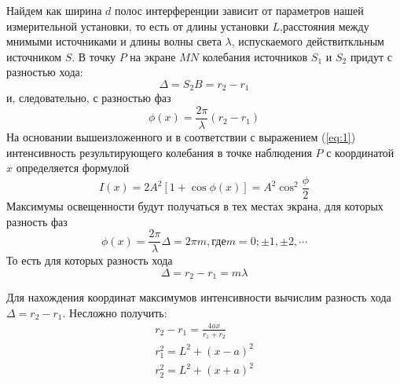Найдем как ширина $d$ полос интерференции зависит от параметров нашей измерительной установки, то есть от длины установки $L$,расстояния между мнимыми источниками и длины волны света  
$\lambda$, испускаемого действиткльным источником $S$. В точку $P$ на экране $MN$ колебания источников $S_1$ и $S_2$ придут с разностью хода:
\begin{equation}
	\Delta=S_2B=r_2-r_1
\end{equation}
и, следовательно, с разностью фаз
\begin{equation}
	\phi(x)=\frac{2\pi}{\lambda}(r_2-r_1)
\end{equation}
На основании вышеизложенного и в соответствии с выражением (\ref{eq:1}) интенсивность результирующего колебания в точке наблюдения $P$ с координатой $x$ определяется формулой
\begin{equation}
	I(x)=2A^2[1+\cos{\phi(x)}]=A^2\cos^2{\frac{\phi}{2}}
\end{equation}
Максимумы освещенности будут получаться в тех местах экрана, для которых разность фаз
\begin{equation}
	\phi(x)=\frac{2\pi}{\lambda}\Delta=2\pi m, \text{где} m=0;\pm 1,\pm 2,\cdots
\end{equation}
То есть для которых разность хода
\begin{equation}
	\Delta=r_2-r_1=m\lambda
\end{equation}

Для нахождения координат максимумов интенсивности вычислим разность хода $\Delta=r_2-r_1$. Несложно получить: 
\begin{gather}
	\label{eq:8}
	r_2-r_1=\frac{4ax}{r_1+r_2} \\ \nonumber
	r_1^2=L^2+(x-a)^2 \\ \nonumber
	r_2^2=L^2+(x+a)^2 \nonumber
\end{gather}


